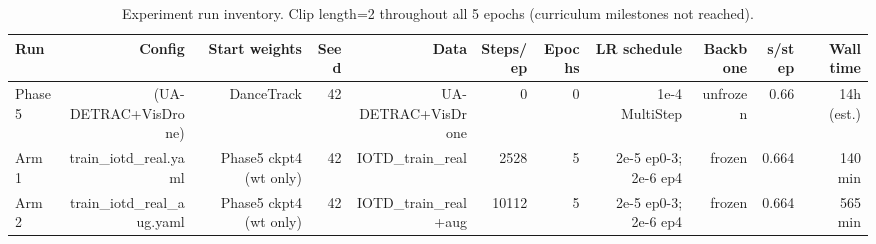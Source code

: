 \begin{table}[ht]
\centering
\caption{Experiment run inventory. Clip length=2 throughout all 5 epochs (curriculum milestones not reached).}
\label{tab:run_inventory}
\begin{tabular}{lrrrrrrrrrr}
\toprule
Run & Config & Start weights & Seed & Data & Steps/ep & Epochs & LR schedule & Backbone & s/step & Wall time \\
\midrule
Phase 5 & (UA-DETRAC+VisDrone) & DanceTrack & 42 & UA-DETRAC+VisDrone & 0 & 0 & 1e-4 MultiStep & unfrozen & ~0.66 & ~14h (est.) \\
Arm 1 & train_iotd_real.yaml & Phase5 ckpt4 (wt only) & 42 & IOTD_train_real & 2528 & 5 & 2e-5 ep0-3; 2e-6 ep4 & frozen & 0.664 & ~140 min \\
Arm 2 & train_iotd_real_aug.yaml & Phase5 ckpt4 (wt only) & 42 & IOTD_train_real+aug & 10112 & 5 & 2e-5 ep0-3; 2e-6 ep4 & frozen & 0.664 & ~565 min \\
\bottomrule
\end{tabular}
\end{table}
